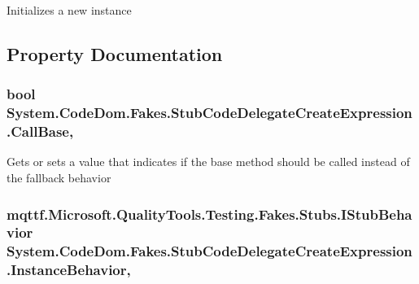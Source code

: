 Initializes a new instance



\subsection{Property Documentation}
\hypertarget{class_system_1_1_code_dom_1_1_fakes_1_1_stub_code_delegate_create_expression_a4bbb35ff631dc1f9c54c0c4db107880f}{
\subsubsection[{Call\-Base}]{\setlength{\rightskip}{0pt plus 5cm}bool System.\-Code\-Dom.\-Fakes.\-Stub\-Code\-Delegate\-Create\-Expression.\-Call\-Base\hspace{0.3cm}{\ttfamily [get]}, {\ttfamily [set]}}}\label{class_system_1_1_code_dom_1_1_fakes_1_1_stub_code_delegate_create_expression_a4bbb35ff631dc1f9c54c0c4db107880f}


Gets or sets a value that indicates if the base method should be called instead of the fallback behavior

\hypertarget{class_system_1_1_code_dom_1_1_fakes_1_1_stub_code_delegate_create_expression_a00912058c301d0a44a7851a2ee3acc10}{
\subsubsection[{Instance\-Behavior}]{\setlength{\rightskip}{0pt plus 5cm}mqttf.\-Microsoft.\-Quality\-Tools.\-Testing.\-Fakes.\-Stubs.\-I\-Stub\-Behavior System.\-Code\-Dom.\-Fakes.\-Stub\-Code\-Delegate\-Create\-Expression.\-Instance\-Behavior\hspace{0.3cm}{\ttfamily [get]}, {\ttfamily [set]}}}\label{class_system_1_1_code_dom_1_1_fakes_1_1_stub_code_delegate_create_expression_a00912058c301d0a44a7851a2ee3acc10}


